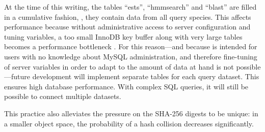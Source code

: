 \label{sec:table-per-species}
At the time of this writing, the tables ``ests'', ``hmmsearch'' and ``blast''
are filled in a cumulative fashion, \ie, they contain data from all query
species. This affects performance because without administrative access to
server configuration and tuning variables, a too small InnoDB key buffer along
with very large tables becomes a performance bottleneck \citep{mysql2013}. For
this reason---and because \pname is intended for users with no knowledge about
MySQL administration, and therefore fine-tuning of server variables in order to
adapt to the amount of data at hand is not possible---future development will
implement separate tables for each query dataset. This ensures high database
performance. With complex SQL queries, it will still be possible to connect
multiple datasets.

This practice also alleviates the pressure on the SHA-256 digests to be unique:
in a smaller object space, the probability of a hash collision decreases
significantly.
